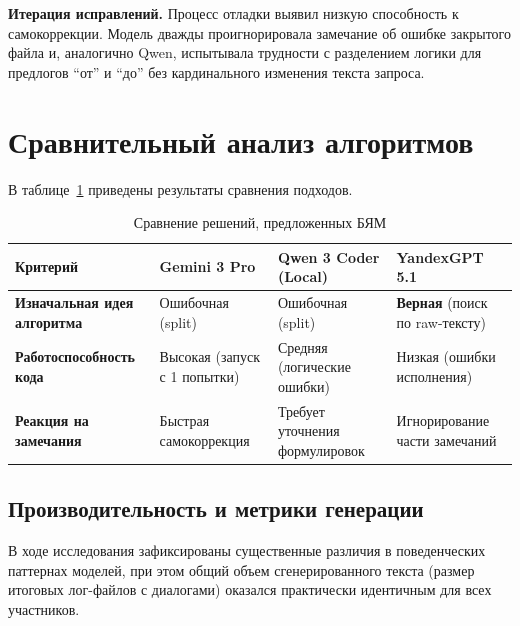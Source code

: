 \textbf{Итерация исправлений.} Процесс отладки выявил низкую способность к самокоррекции. Модель дважды проигнорировала замечание об ошибке закрытого файла и, аналогично Qwen, испытывала трудности с разделением логики для предлогов ``от'' и ``до'' без кардинального изменения текста запроса.

\section{Сравнительный анализ алгоритмов}

В таблице~\ref{tab:comparison} приведены результаты сравнения подходов.

\begin{table}[H]
\centering
\caption{Сравнение решений, предложенных БЯМ}
\label{tab:comparison}
\begin{tabular}{|p{3.6cm}|p{3.6cm}|p{3.6cm}|p{3.6cm}|}
\hline
\textbf{Критерий} & \textbf{Gemini 3 Pro} & \textbf{Qwen 3 Coder (Local)} & \textbf{YandexGPT 5.1} \\ \hline
\textbf{Изначальная идея алгоритма} & Ошибочная (split) & Ошибочная (split) & \textbf{Верная} (поиск по raw-тексту) \\ \hline
\textbf{Работоспособность кода} & Высокая (запуск с 1 попытки) & Средняя (логические ошибки) & Низкая (ошибки исполнения) \\ \hline
\textbf{Реакция на замечания} & Быстрая самокоррекция & Требует уточнения формулировок & Игнорирование части замечаний \\ \hline
\end{tabular}
\end{table}

\subsection{Производительность и метрики генерации}

В ходе исследования зафиксированы существенные различия в поведенческих паттернах моделей, при этом общий объем сгенерированного текста (размер итоговых лог-файлов с диалогами) оказался практически идентичным для всех участников.

